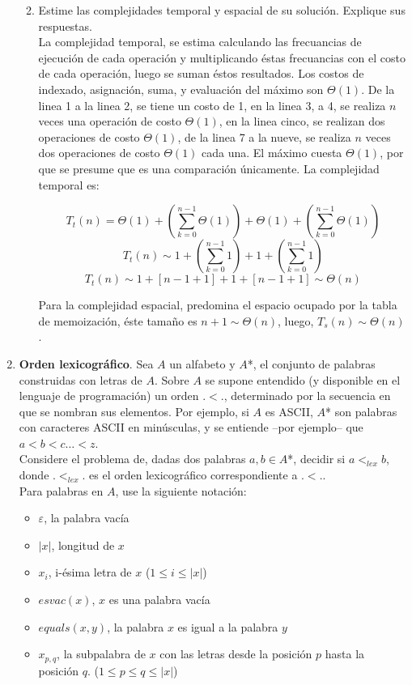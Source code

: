 \documentclass[11pt,spanish]{article}
\renewcommand{\epsilon}{\varepsilon}
\begin{document}
\begin{enumerate}
\begin{enumerate}
		\newpage
	
		\item Estime las complejidades temporal y espacial de su solución. Explique sus respuestas. \\
		
		La complejidad temporal, se estima calculando las frecuancias de ejecución de cada operación y multiplicando éstas frecuancias con el costo de cada operación, luego se suman éstos resultados. Los costos de indexado, asignación, suma, y evaluación del máximo son $\Theta(1)$. De la linea 1 a la linea 2, se tiene un costo de 1, en la linea 3, a 4, se realiza $n$ veces una operación de costo $\Theta(1)$, en la linea cinco, se realizan dos operaciones de costo $\Theta(1)$, de la linea 7 a la nueve, se realiza $n$ veces dos operaciones de costo $\Theta(1)$ cada una. El máximo cuesta $\Theta(1)$, por que se presume que es una comparación únicamente. La complejidad temporal es:
		
		$$T_{t}(n) = \Theta(1) + \left(\sum_{k = 0}^{n - 1}{\Theta(1)}\right) + \Theta(1) + \left(\sum_{k = 0}^{n - 1}{\Theta(1)}\right)$$
		$$T_{t}(n) \sim 1 + \left(\sum_{k = 0}^{n - 1}{1}\right) + 1 + \left(\sum_{k = 0}^{n - 1}{1}\right)$$
		$$T_{t}(n) \sim 1 + \left[ n - 1 + 1 \right] + 1 + \left[ n - 1 + 1 \right] \sim \Theta(n)$$
		
		Para la complejidad espacial, predomina el espacio ocupado por la tabla de memoización, éste tamaño es $n + 1 \sim \Theta(n)$, luego, $T_{s}(n) \sim \Theta(n)$.
	
	\end{enumerate}
	
	\item \textbf{Orden lexicográfico}. Sea $A$ un alfabeto y $A$*, el conjunto de palabras construidas con letras de $A$. Sobre $A$ se supone
entendido (y disponible en el lenguaje de programación) un orden $.<.$, determinado por la secuencia en que se nombran sus elementos. Por ejemplo, si $A$ es ASCII, $A$* son palabras con caracteres ASCII en minúsculas, y se entiende –por ejemplo– que $a<b<c…<z$.\\
Considere el problema de, dadas dos palabras $a,b \in A$*, decidir si $a <_{lex} b$, donde $.<_{lex}.$ es el orden lexicográfico correspondiente a $.<.$. \\
Para palabras en $A$, use la siguiente notación:

\begin{itemize}
  \item $\epsilon$, la palabra vacía
  \item $\left| x \right|$, longitud de $x$
  \item $x_{i}$, i-ésima letra de $x$ ($1 \leq i \leq \left| x \right|$)
  \item $esvac(x)$, $x$ es una palabra vacía
  \item $equals(x, y)$, la palabra $x$ es igual a la palabra $y$
  \item $x_{p,q}$, la subpalabra de $x$ con las letras desde la posición $p$ hasta la posición $q$. ($1 \leq p \leq q \leq \left| x \right|$)
\end{itemize}


\end{enumerate}
\end{document}
